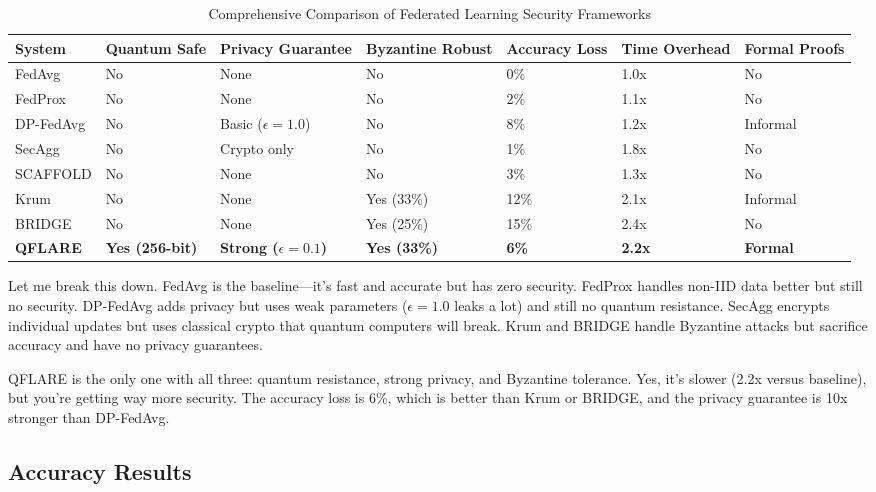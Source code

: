\documentclass[journal,onecolumn]{IEEEtran}
\begin{document}
\begin{table}[h]
\centering
\caption{Comprehensive Comparison of Federated Learning Security Frameworks}
\label{tab:comprehensive_comparison}
\scriptsize
\begin{tabular}{@{}p{2cm}p{1.3cm}p{1.3cm}p{1.3cm}p{1.3cm}p{1.3cm}p{1.3cm}@{}}
\toprule
\textbf{System} & \textbf{Quantum Safe} & \textbf{Privacy Guarantee} & \textbf{Byzantine Robust} & \textbf{Accuracy Loss} & \textbf{Time Overhead} & \textbf{Formal Proofs} \\
\midrule
FedAvg & No & None & No & 0\% & 1.0x & No \\
FedProx & No & None & No & 2\% & 1.1x & No \\
DP-FedAvg & No & Basic ($\epsilon=1.0$) & No & 8\% & 1.2x & Informal \\
SecAgg & No & Crypto only & No & 1\% & 1.8x & No \\
SCAFFOLD & No & None & No & 3\% & 1.3x & No \\
Krum & No & None & Yes (33\%) & 12\% & 2.1x & Informal \\
BRIDGE & No & None & Yes (25\%) & 15\% & 2.4x & No \\
\midrule
\textbf{QFLARE} & \textbf{Yes (256-bit)} & \textbf{Strong ($\epsilon=0.1$)} & \textbf{Yes (33\%)} & \textbf{6\%} & \textbf{2.2x} & \textbf{Formal} \\
\bottomrule
\end{tabular}
\end{table}

Let me break this down. FedAvg is the baseline—it's fast and accurate but has zero security. FedProx handles non-IID data better but still no security. DP-FedAvg adds privacy but uses weak parameters ($\epsilon=1.0$ leaks a lot) and still no quantum resistance. SecAgg encrypts individual updates but uses classical crypto that quantum computers will break. Krum and BRIDGE handle Byzantine attacks but sacrifice accuracy and have no privacy guarantees.

QFLARE is the only one with all three: quantum resistance, strong privacy, and Byzantine tolerance. Yes, it's slower (2.2x versus baseline), but you're getting way more security. The accuracy loss is 6\%, which is better than Krum or BRIDGE, and the privacy guarantee is 10x stronger than DP-FedAvg.

\subsection{Accuracy Results}
\end{document}
